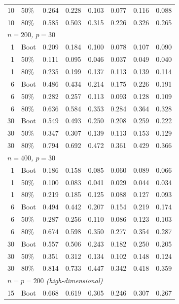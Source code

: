 \documentclass[11pt]{article}
\theoremstyle{plain}
\theoremstyle{definition}
\theoremstyle{remark}
\begin{document}
\begin{table}[htbp!]
\begin{tabular}{rlrrrrrr}
		10 & 50\% & 0.264 & 0.228 & 0.103 & 0.077 & 0.116 & 0.088 \\
		10 & 80\% & 0.585 & 0.503 & 0.315 & 0.226 & 0.326 & 0.265 \\[4pt]
		\multicolumn{8}{l}{\textit{$n = 200$, $p = 30$}} \\[2pt]
		1  & Boot & 0.209 & 0.184 & 0.100 & 0.078 & 0.107 & 0.090 \\
		1  & 50\% & 0.111 & 0.095 & 0.046 & 0.037 & 0.049 & 0.040 \\
		1  & 80\% & 0.235 & 0.199 & 0.137 & 0.113 & 0.139 & 0.114 \\
		6  & Boot & 0.486 & 0.434 & 0.214 & 0.175 & 0.226 & 0.191 \\
		6  & 50\% & 0.282 & 0.257 & 0.113 & 0.093 & 0.128 & 0.109 \\
		6  & 80\% & 0.636 & 0.584 & 0.353 & 0.284 & 0.364 & 0.328 \\
		30 & Boot & 0.549 & 0.493 & 0.250 & 0.208 & 0.259 & 0.222 \\
		30 & 50\% & 0.347 & 0.307 & 0.139 & 0.113 & 0.153 & 0.129 \\
		30 & 80\% & 0.794 & 0.692 & 0.472 & 0.361 & 0.429 & 0.366 \\[4pt]
		\multicolumn{8}{l}{\textit{$n = 400$, $p = 30$}} \\[2pt]
		1  & Boot & 0.186 & 0.158 & 0.085 & 0.060 & 0.089 & 0.066 \\
		1  & 50\% & 0.100 & 0.083 & 0.041 & 0.029 & 0.044 & 0.034 \\
		1  & 80\% & 0.219 & 0.185 & 0.125 & 0.088 & 0.127 & 0.093 \\
		6  & Boot & 0.494 & 0.442 & 0.207 & 0.154 & 0.219 & 0.174 \\
		6  & 50\% & 0.287 & 0.256 & 0.110 & 0.086 & 0.123 & 0.103 \\
		6  & 80\% & 0.674 & 0.598 & 0.350 & 0.277 & 0.354 & 0.287 \\
		30 & Boot & 0.557 & 0.506 & 0.243 & 0.182 & 0.250 & 0.205 \\
		30 & 50\% & 0.351 & 0.312 & 0.134 & 0.102 & 0.148 & 0.124 \\
		30 & 80\% & 0.814 & 0.733 & 0.447 & 0.342 & 0.418 & 0.359 \\[4pt]
		\multicolumn{8}{l}{\textit{$n = p = 200$ (high-dimensional)}} \\[2pt]
		15 & Boot & 0.668 & 0.619 & 0.305 & 0.246 & 0.307 & 0.267 \\
		\hline
	\end{tabular}
\end{table}
\end{document}
